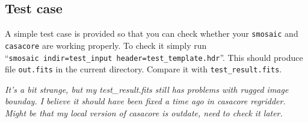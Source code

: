 \documentclass[12pt]{article}
\begin{document}
\subsection{Test case}

A simple test case is provided so that you can check whether your 
\verb/smosaic/ and \verb/casacore/ are working properly. To check it simply
run \\
``\verb/smosaic indir=test_input header=test_template.hdr/''. This
should produce file \verb/out.fits/ in the current directory. Compare it with
\verb/test_result.fits/.

\emph{ It's a bit strange, but my test\_result.fits still has problems with rugged
image bounday. I believe it should have been fixed a time ago in casacore 
regridder. Might be that my local version of casacore is outdate, need to check it
later.}
\end{document}
